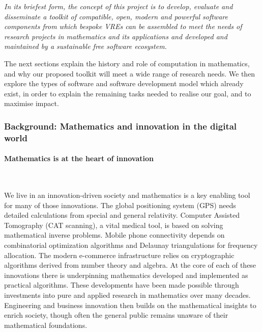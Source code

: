 
\begin{center}
\begin{boxedminipage}{.95\textwidth}\em
In its briefest form, the concept of this project is to develop,
evaluate and disseminate a
toolkit of compatible, open, modern and powerful software components from
which bespoke VREs can be assembled to meet the needs of research
projects in mathematics and its applications and developed and
maintained by a sustainable free software ecosystem.
\end{boxedminipage}
\end{center}

The next sections explain the history and role of computation in mathematics,
and why our proposed toolkit will meet a wide range of research
needs. We then explore the types of software and software development
model which already exist, in order to explain the remaining tasks
needed to realise our goal, and to maximise impact.

\subsubsection{Background: Mathematics and innovation in the digital world}\label{sec:innovation}

\paragraph{Mathematics is at the heart of innovation}\

We live in an innovation-driven society and mathematics is a key enabling tool for
many of those innovations.
The global
positioning system (GPS) needs detailed calculations from special and
general relativity.
Computer Assisted Tomography (CAT scanning), a vital medical tool, is based on solving
mathematical inverse problems.
Mobile phone connectivity depends on combinatorial optimization
algorithms and Delaunay triangulations for frequency allocation.
The modern
e-commerce infrastructure relies on cryptographic algorithms
derived from number theory and algebra. At the core of each of these innovations
there is underpinning mathematics developed and implemented as practical
algorithms. These developments have been made possible through investments
into pure and applied research in mathematics over many decades.
Engineering and business innovation then builds on the mathematical
insights to enrich society, though often the
general public remains unaware of their mathematical foundations.


